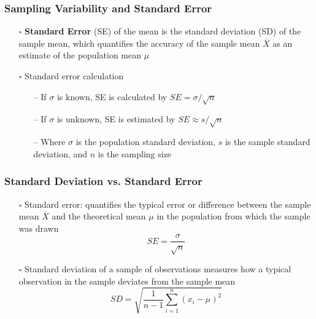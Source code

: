 \documentclass[handout]{beamer}
\begin{document}
\begin{frame}
    \frametitle{Sampling Variability and Standard Error}
    \begin{itemize}[wide = 0pt]
        \item[$\square$] \textbf{\color{red}Standard Error} (SE) of the mean is the standard deviation (SD) of the sample mean, which quantifies the accuracy of the sample mean $\overline{X}$ as an estimate of the population mean $\mu$
        \vspace{8pt}
        \item[$\square$] Standard error calculation
        \begin{itemize}
            \item[--] If $\sigma$ is known, SE is calculated by $SE = \sigma/\sqrt{n}$
            \item[--] If $\sigma$ is unknown, SE is estimated by $SE \approx s/\sqrt{n}$
            \item[--] Where $\sigma$ is the population standard deviation, $s$ is the sample standard deviation, and $n$ is the sampling size
        \end{itemize}
    \end{itemize}
    \vspace*{\fill}
\end{frame}

\begin{frame}
    \frametitle{Standard Deviation vs. Standard Error}
    \begin{itemize}[wide = 0pt]
        \item[$\square$] Standard error: quantifies the typical error or difference between the sample mean $\overline{X}$ and the theoretical mean $\mu$ in the population from which the sample was drawn
        \begin{equation*}
            SE = \frac{\sigma}{\sqrt{n}}
        \end{equation*}
        \item[$\square$] Standard deviation of a sample of observations measures how a typical observation in the sample deviates from the sample mean
        \begin{equation*}
            SD = \sqrt{\frac{1}{n-1}\sum_{i=1}^n(x_i-\mu)^2}
        \end{equation*}
    \end{itemize}
\end{frame}
\end{document}
